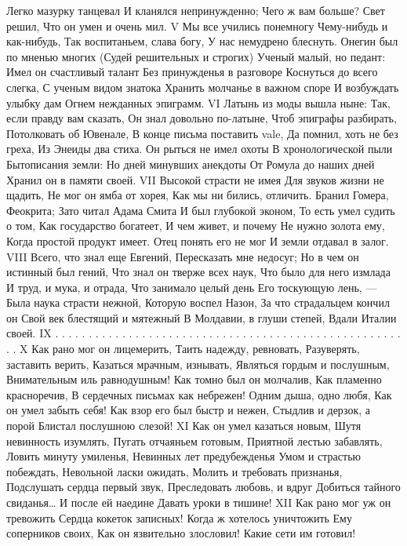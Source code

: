 Легко мазурку танцевал
И кланялся непринужденно;
Чего ж вам больше? Свет решил,
Что он умен и очень мил.
V
Мы все учились понемногу
Чему-нибудь и как-нибудь,
Так воспитаньем, слава богу,
У нас немудрено блеснуть.
Онегин был по мненью многих
(Судей решительных и строгих)
Ученый малый, но педант:
Имел он счастливый талант
Без принужденья в разговоре
Коснуться до всего слегка,
С ученым видом знатока
Хранить молчанье в важном споре
И возбуждать улыбку дам
Огнем нежданных эпиграмм.
VI
Латынь из моды вышла ныне:
Так, если правду вам сказать,
Он знал довольно по-латыне,
Чтоб эпиграфы разбирать,
Потолковать об Ювенале,
В конце письма поставить vale,
Да помнил, хоть не без греха,
Из Энеиды два стиха.
Он рыться не имел охоты
В хронологической пыли
Бытописания земли:
Но дней минувших анекдоты
От Ромула до наших дней
Хранил он в памяти своей.
VII
Высокой страсти не имея
Для звуков жизни не щадить,
Не мог он ямба от хорея,
Как мы ни бились, отличить.
Бранил Гомера, Феокрита;
Зато читал Адама Смита
И был глубокой эконом,
То есть умел судить о том,
Как государство богатеет,
И чем живет, и почему
Не нужно золота ему,
Когда простой продукт имеет.
Отец понять его не мог
И земли отдавал в залог.
VIII
Всего, что знал еще Евгений,
Пересказать мне недосуг;
Но в чем он истинный был гений,
Что знал он тверже всех наук,
Что было для него измлада
И труд, и мука, и отрада,
Что занимало целый день
Его тоскующую лень, —
Была наука страсти нежной,
Которую воспел Назон,
За что страдальцем кончил он
Свой век блестящий и мятежный
В Молдавии, в глуши степей,
Вдали Италии своей.
IX
. . . . . . . . . . . . . . . . . .
. . . . . . . . . . . . . . . . . .
. . . . . . . . . . . . . . . . . .
X
Как рано мог он лицемерить,
Таить надежду, ревновать,
Разуверять, заставить верить,
Казаться мрачным, изнывать,
Являться гордым и послушным,
Внимательным иль равнодушным!
Как томно был он молчалив,
Как пламенно красноречив,
В сердечных письмах как небрежен!
Одним дыша, одно любя,
Как он умел забыть себя!
Как взор его был быстр и нежен,
Стыдлив и дерзок, а порой
Блистал послушною слезой!
XI
Как он умел казаться новым,
Шутя невинность изумлять,
Пугать отчаяньем готовым,
Приятной лестью забавлять,
Ловить минуту умиленья,
Невинных лет предубежденья
Умом и страстью побеждать,
Невольной ласки ожидать,
Молить и требовать признанья,
Подслушать сердца первый звук,
Преследовать любовь, и вдруг
Добиться тайного свиданья…
И после ей наедине
Давать уроки в тишине!
XII
Как рано мог уж он тревожить
Сердца кокеток записных!
Когда ж хотелось уничтожить
Ему соперников своих,
Как он язвительно злословил!
Какие сети им готовил!
